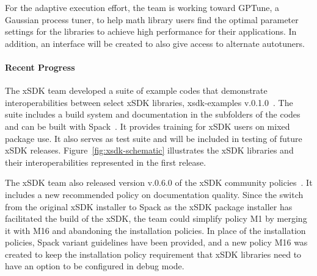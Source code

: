For the adaptive execution effort, the team is working toward GPTune, a Gaussian process tuner, to help math library users find the optimal parameter settings for the libraries to achieve high performance for their applications. In addition, an interface will be created to also give access to alternate autotuners.


\paragraph{Recent Progress}

The xSDK team developed a suite of example codes that demonstrate interoperabilities between select xSDK libraries, xsdk-examples v.0.1.0~\cite{xsdk-examples}. The suite includes a build system and documentation in the subfolders of the codes and can be built with Spack~\cite{gamblin+:sc15}. It provides training for xSDK users on mixed package use. It also serves as test suite and will be included in testing of future xSDK releases.
Figure~\ref{fig:xsdk-schematic} illustrates the xSDK libraries and their interoperabilities represented in the first release.

The xSDK team also released version v.0.6.0 of the xSDK community policies~\cite{xsdk-policies:github}. It includes a new recommended policy on documentation quality. Since the switch from the original xSDK installer to Spack as the xSDK package installer has facilitated the build of the xSDK, the team could simplify policy M1 by merging it with M16 and abandoning the installation policies. In place of the installation policies, Spack variant guidelines have been provided, and a new policy M16 was created to keep the installation policy requirement that xSDK libraries need to have an option to be configured in debug mode.

